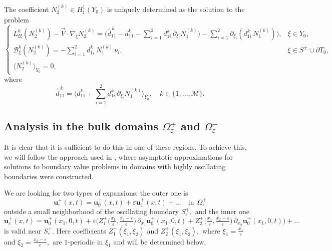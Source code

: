 \documentclass[reqno]{amsart}            %
\numberwithin{equation}{section}
\begin{document}
	
	The coefficient $N^{(k)}_2\in H^1_\sharp(Y_0)$ is uniquely determined as the solution to the problem 
	\begin{equation}\label{problem-N-2}
		\left\{
		\begin{array}{ll}
			L^k_{\xi\xi}(N_2^{(k)}) - \overrightarrow{V} \cdot \nabla_{\xi}N^{(k)}_{2} = \Big(\widehat{d}^{\,k}_{11} - d^k_{11}
			- \sum_{i=1}^{2}d^k_{1 i}\,\partial_{\xi_i}N^{(k)}_1\Big) - \sum_{i=1}^{2}\partial_{\xi_i}(d^k_{1 i}\, N^{(k)}_1)\big), &
			\xi\in Y_0,
			\\[3pt]
			\mathcal{B}^k_{\xi}(N_2^{(k)}) =  - \sum_{i=1}^{2}d^k_{1 i}\,N_1^{(k)}\,\nu_i,
			&  \xi \in S^{\pm} \cup \partial T_0,
			\\[3pt]
			\langle N_2^{(k)}\rangle_{Y_0}= 0, & 
		\end{array}
		\right.
	\end{equation}
	where 
	\begin{equation}\label{hom-coeff}
		\widehat{d}^{\,k}_{11} = \big\langle d^k_{11} + \sum_{i=1}^{2}d^k_{1 i}\,\partial_{\xi_i}N^{(k)}_1 \big\rangle_{Y_0}, \quad k\in \{1,\ldots,\mathcal{M}\}.
	\end{equation}
	
	\subsection{Analysis in the bulk domains $\Omega^+_\varepsilon$ and $\Omega^-_\varepsilon$}\label{Par-4-2} 
	
	It is clear that it is sufficient to do this in one of these regions.   
	To achieve this, we will follow the approach used in \cite{Mel-1999,Mel-Naz-1997}, where asymptotic approximations for solutions to boundary value problems in domains with highly oscillating boundaries were constructed.
	
	We are looking for two types of expansions: the  outer one is
	\begin{equation}\label{exp-1}
		\mathbf{u}^+_\varepsilon(x,t) = \mathbf{u}^+_0(x,t) + \varepsilon \mathbf{u}^+_1(x,t) + \ldots  \quad \text{in} \ \ \Omega^+_\varepsilon
	\end{equation}
	outside a small neighborhood of the oscillating boundary $S^+_\varepsilon,$ and  the inner one 
	\begin{equation}\label{outer-1}
		\mathbf{u}^+_\varepsilon(x,t) = \mathbf{u}^+_0(x_1,0,t) + \varepsilon \Big(Z^+_1\big(\tfrac{x_1}{\varepsilon}, 
		\tfrac{x_2- \varepsilon}{\varepsilon}\big)\, \partial_{x_1}\mathbf{u}^+_0(x_1,0,t) + Z^+_2\big(\tfrac{x_1}{\varepsilon}, 
		\tfrac{x_2- \varepsilon}{\varepsilon}\big)\, \partial_{x_2}\mathbf{u}^+_0(x_1,0,t)\Big) +  \ldots
	\end{equation}
	is valid near  $S^+_\varepsilon.$ Here coefficients $Z^+_1(\xi_1, \xi_2)$ and $Z^+_2(\xi_1, \xi_2),$ where $\xi_1 = \frac{x_1}{\varepsilon}$ and $\xi_2 = \frac{x_2 - \varepsilon}{\varepsilon},$ are $1$-periodic in $\xi_1$ and will be determined below.
	
\end{document}
